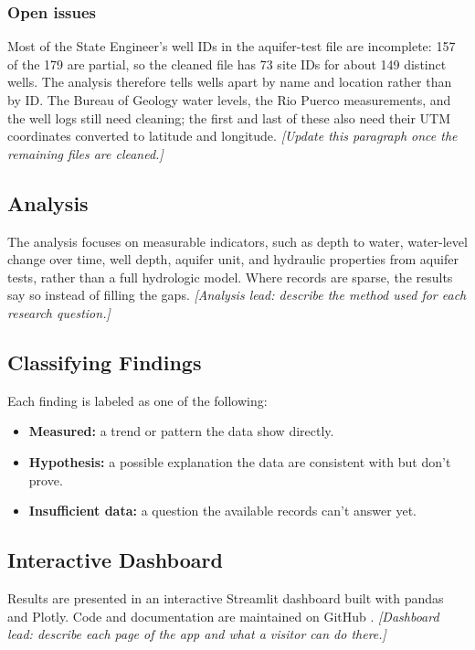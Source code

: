 \documentclass[10pt,twocolumn,letterpaper]{article}
\newif\ifdraftnotes \draftnotestrue   %
\newcommand{\draftnote}[1]{\ifdraftnotes{\color{draftorange}\itshape[#1]}\fi}
\begin{document}
\subsubsection{Open issues}
Most of the State Engineer's well IDs in the aquifer-test file are incomplete: 157 of the 179 are
partial, so the cleaned file has 73 site IDs for about 149 distinct wells. The analysis therefore
tells wells apart by name and location rather than by ID. The Bureau of Geology water levels, the
Rio Puerco measurements, and the well logs still need cleaning; the first and last of these also
need their UTM coordinates converted to latitude and longitude.
\draftnote{Update this paragraph once the remaining files are cleaned.}

\subsection{Analysis}
The analysis focuses on measurable indicators, such as depth to water, water-level change over
time, well depth, aquifer unit, and hydraulic properties from aquifer tests, rather than a full
hydrologic model. Where records
are sparse, the results say so instead of filling the gaps.
\draftnote{Analysis lead: describe the method used for each research question.}

\subsection{Classifying Findings}
Each finding is labeled as one of the following:
\begin{itemize}
  \item \textbf{Measured:} a trend or pattern the data show directly.
  \item \textbf{Hypothesis:} a possible explanation the data are consistent with but don't prove.
  \item \textbf{Insufficient data:} a question the available records can't answer yet.
\end{itemize}

\subsection{Interactive Dashboard}
Results are presented in an interactive Streamlit dashboard built with pandas and Plotly. Code
and documentation are maintained on GitHub \citep{team23_repo}.
\draftnote{Dashboard lead: describe each page of the app and what a visitor can do there.}

\end{document}
